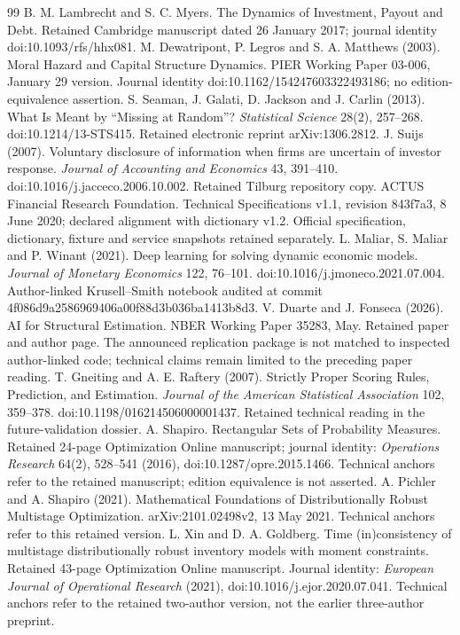 \documentclass[11pt,a4paper]{article}
\begin{document}
\begin{thebibliography}{99}
 B. M. Lambrecht and S. C. Myers. The Dynamics of Investment, Payout and Debt. Retained Cambridge manuscript dated 26 January 2017; journal identity doi:10.1093/rfs/hhx081.
 M. Dewatripont, P. Legros and S. A. Matthews (2003). Moral Hazard and Capital Structure Dynamics. PIER Working Paper 03-006, January 29 version. Journal identity doi:10.1162/154247603322493186; no edition-equivalence assertion.
 S. Seaman, J. Galati, D. Jackson and J. Carlin (2013). What Is Meant by ``Missing at Random''? \emph{Statistical Science} 28(2), 257--268. doi:10.1214/13-STS415. Retained electronic reprint arXiv:1306.2812.
 J. Suijs (2007). Voluntary disclosure of information when firms are uncertain of investor response. \emph{Journal of Accounting and Economics} 43, 391--410. doi:10.1016/j.jacceco.2006.10.002. Retained Tilburg repository copy.
 ACTUS Financial Research Foundation. Technical Specifications v1.1, revision 843f7a3, 8 June 2020; declared alignment with dictionary v1.2. Official specification, dictionary, fixture and service snapshots retained separately.
 L. Maliar, S. Maliar and P. Winant (2021). Deep learning for solving dynamic economic models. \emph{Journal of Monetary Economics} 122, 76--101. doi:10.1016/j.jmoneco.2021.07.004. Author-linked Krusell--Smith notebook audited at commit 4f086d9a2586969406a00f88d3b036ba1413b8d3.
 V. Duarte and J. Fonseca (2026). AI for Structural Estimation. NBER Working Paper 35283, May. Retained paper and author page. The announced replication package is not matched to inspected author-linked code; technical claims remain limited to the preceding paper reading.
 T. Gneiting and A. E. Raftery (2007). Strictly Proper Scoring Rules, Prediction, and Estimation. \emph{Journal of the American Statistical Association} 102, 359--378. doi:10.1198/016214506000001437. Retained technical reading in the future-validation dossier.
 A. Shapiro. Rectangular Sets of Probability Measures. Retained 24-page Optimization Online manuscript; journal identity: \emph{Operations Research} 64(2), 528--541 (2016), doi:10.1287/opre.2015.1466. Technical anchors refer to the retained manuscript; edition equivalence is not asserted.
 A. Pichler and A. Shapiro (2021). Mathematical Foundations of Distributionally Robust Multistage Optimization. arXiv:2101.02498v2, 13 May 2021. Technical anchors refer to this retained version.
 L. Xin and D. A. Goldberg. Time (in)consistency of multistage distributionally robust inventory models with moment constraints. Retained 43-page Optimization Online manuscript. Journal identity: \emph{European Journal of Operational Research} (2021), doi:10.1016/j.ejor.2020.07.041. Technical anchors refer to the retained two-author version, not the earlier three-author preprint.


\end{thebibliography}
\end{document}

